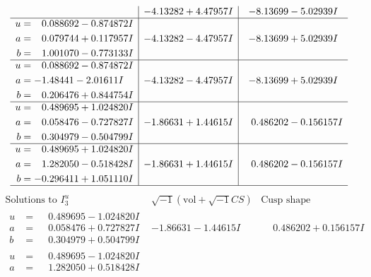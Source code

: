 \documentclass[1p]{elsarticle_modified}
\theoremstyle{definition}
\newcommand{\I}{\sqrt{-1}}
\begin{document}
$$\begin{array}{c|c|c}
 & -4.13282 + 4.47957 I & -8.13699 - 5.02939 I \\ \hline\begin{aligned}
u &= \phantom{-}0.088692 - 0.874872 I \\
a &= \phantom{-}0.079744 + 0.117957 I \\
b &= \phantom{-}1.001070 - 0.773133 I\end{aligned}
 & -4.13282 - 4.47957 I & -8.13699 + 5.02939 I \\ \hline\begin{aligned}
u &= \phantom{-}0.088692 - 0.874872 I \\
a &= -1.48441 - 2.01611 I \\
b &= \phantom{-}0.206476 + 0.844754 I\end{aligned}
 & -4.13282 - 4.47957 I & -8.13699 + 5.02939 I \\ \hline\begin{aligned}
u &= \phantom{-}0.489695 + 1.024820 I \\
a &= \phantom{-}0.058476 - 0.727827 I \\
b &= \phantom{-}0.304979 - 0.504799 I\end{aligned}
 & -1.86631 + 1.44615 I & \phantom{-}0.486202 - 0.156157 I \\ \hline\begin{aligned}
u &= \phantom{-}0.489695 + 1.024820 I \\
a &= \phantom{-}1.282050 - 0.518428 I \\
b &= -0.296411 + 1.051110 I\end{aligned}
 & -1.86631 + 1.44615 I & \phantom{-}0.486202 - 0.156157 I\\
 \hline 
 \end{array}$$\newpage$$\begin{array}{c|c|c}  
\text{Solutions to }I^u_{3}& \I (\text{vol} + \sqrt{-1}CS) & \text{Cusp shape}\\
 \hline 
\begin{aligned}
u &= \phantom{-}0.489695 - 1.024820 I \\
a &= \phantom{-}0.058476 + 0.727827 I \\
b &= \phantom{-}0.304979 + 0.504799 I\end{aligned}
 & -1.86631 - 1.44615 I & \phantom{-}0.486202 + 0.156157 I \\ \hline\begin{aligned}
u &= \phantom{-}0.489695 - 1.024820 I \\
a &= \phantom{-}1.282050 + 0.518428 I \\

\end{aligned}
\end{array}$$
\end{document}
